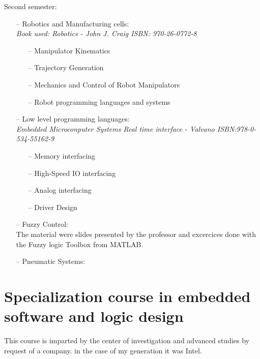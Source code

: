 \documentclass{article}
\begin{document}
Second semester:
    \begin{itemize}
     \setlength\itemsep{0pt}
        \item[--] Robotics and Manufacturing cells:\\
           \emph{ Book used: Robotics - John J. Craig  ISBN: 970-26-0772-8}
            \begin{itemize}
     \setlength\itemsep{0pt}
                \item[--] Manipulator Kinematics
                \item[--] Trajectory Generation
                \item[--] Mechanics and Control of Robot Manipulators
                \item[--] Robot programming languages and systems
            \end{itemize}
        \item[--] Low level programming languages:\\
           \emph{ Embedded Microconputer Systems Real time interface - Valvano ISBN:978-0-534-55162-9}
            \begin{itemize}
     \setlength\itemsep{0pt}
            \item[--] Memory interfacing
            \item[--] High-Speed IO interfacing
            \item[--] Analog interfacing
            \item[--] Driver Design
            \end{itemize}
        \item[--] Fuzzy Control:\\
            The material were slides presented by the professor and excercices done with the
            Fuzzy logic Toolbox from MATLAB.
        \item[--] Pneumatic Systems:\\
    \end{itemize}
                    



\section{Specialization course in embedded software and logic design}

This course is imparted by the center of investigation and advanced studies by request of
a company. in the case of my generation it was Intel.
\end{document}
